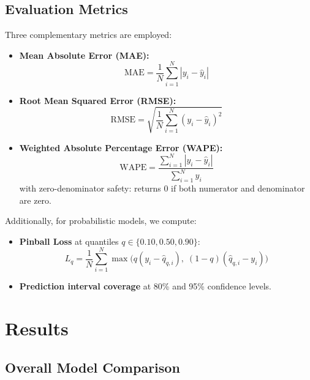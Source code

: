 \documentclass[conference]{IEEEtran}
\begin{document}
\subsection{Evaluation Metrics}

Three complementary metrics are employed:

\begin{itemize}
    \item \textbf{Mean Absolute Error (MAE):}
    \begin{equation}
        \text{MAE} = \frac{1}{N}\sum_{i=1}^{N} |y_i - \hat{y}_i|
    \end{equation}

    \item \textbf{Root Mean Squared Error (RMSE):}
    \begin{equation}
        \text{RMSE} = \sqrt{\frac{1}{N}\sum_{i=1}^{N} (y_i - \hat{y}_i)^2}
    \end{equation}

    \item \textbf{Weighted Absolute Percentage Error (WAPE):}
    \begin{equation}
        \text{WAPE} = \frac{\sum_{i=1}^{N} |y_i - \hat{y}_i|}{\sum_{i=1}^{N} y_i}
    \end{equation}
    with zero-denominator safety: returns 0 if both numerator and denominator are zero.
\end{itemize}

Additionally, for probabilistic models, we compute:
\begin{itemize}
    \item \textbf{Pinball Loss} at quantiles $q \in \{0.10, 0.50, 0.90\}$:
    \begin{equation}
        L_q = \frac{1}{N}\sum_{i=1}^{N} \max\bigl(q(y_i - \hat{q}_{q,i}),\; (1-q)(\hat{q}_{q,i} - y_i)\bigr)
    \end{equation}
    \item \textbf{Prediction interval coverage} at 80\% and 95\% confidence levels.
\end{itemize}

\section{Results}

\subsection{Overall Model Comparison}
\end{document}
